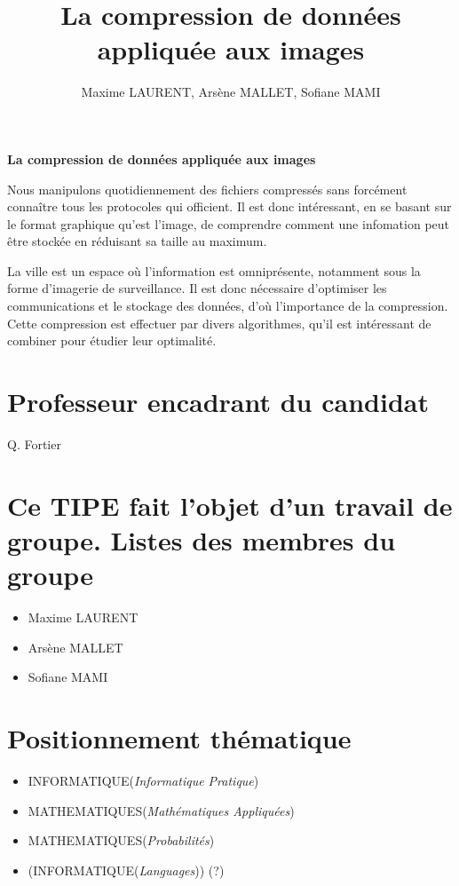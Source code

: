 \documentclass[a4paper, 11pt]{article}
\author{Maxime LAURENT, Arsène MALLET, Sofiane MAMI}
\title{La compression de donn\'ees appliqu\'ee aux images}
\begin{document}
    
\begin{center}
    {\textbf {\LARGE La compression de donn\'ees appliqu\'ee aux images}}
\end{center}

\vspace{5mm}

Nous manipulons quotidiennement des fichiers compressés sans forcément conna\^itre tous les protocoles qui officient. Il est donc intéressant, en se basant sur le format graphique qu'est l'image, de comprendre comment une infomation peut être stockée en réduisant sa taille au maximum.

La ville est un espace où l'information est omniprésente, notamment sous la forme d'imagerie de surveillance. Il est donc nécessaire d'optimiser les communications et le stockage des données, d'où l'importance de la compression. Cette compression est effectuer par divers algorithmes, qu'il est intéressant de combiner pour étudier leur optimalité.

\section*{Professeur encadrant du candidat}
Q. Fortier

\section*{Ce TIPE fait l'objet d'un travail de groupe. \newline Listes des membres du groupe}
\begin{itemize}
    \item Maxime LAURENT
    \item Arsène MALLET
    \item Sofiane MAMI
\end{itemize}

\section*{Positionnement th\'ematique}
\begin{itemize}
    \item INFORMATIQUE(\textit{Informatique Pratique})
    \item MATHEMATIQUES(\textit{Math\'ematiques Appliqu\'ees})
    \item MATHEMATIQUES(\textit{Probabilit\'es})
    \item \scriptsize{(INFORMATIQUE(\textit{Languages}))} (?)
\end{itemize}
\end{document}
